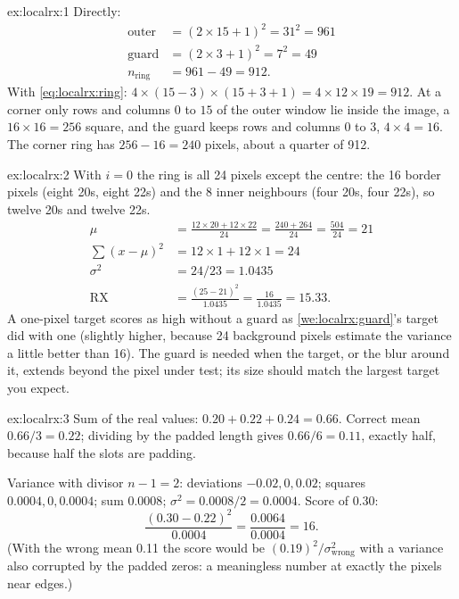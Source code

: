 
\begin{solution}{ex:localrx:1}
Directly:
\begin{align*}
\text{outer} &= (2\times15 + 1)^2 = 31^2 = 961\\
\text{guard} &= (2\times3 + 1)^2 = 7^2 = 49\\
n_{\text{ring}} &= 961 - 49 = 912 .
\end{align*}
With \cref{eq:localrx:ring}: $4\times(15 - 3)\times(15 + 3 + 1) = 4\times12\times19 = 912$.
At a corner only rows and columns $0$ to $15$ of the outer window lie inside the image, a
$16\times16 = 256$ square, and the guard keeps rows and columns $0$ to $3$, $4\times4 = 16$. The corner
ring has $256 - 16 = 240$ pixels, about a quarter of 912.
\end{solution}

\begin{solution}{ex:localrx:2}
With $i = 0$ the ring is all 24 pixels except the centre: the 16 border pixels (eight 20s, eight 22s)
and the 8 inner neighbours (four 20s, four 22s), so twelve 20s and twelve 22s.
\begin{align*}
\mu &= \frac{12\times20 + 12\times22}{24} = \frac{240 + 264}{24} = \frac{504}{24} = 21\\
\textstyle\sum(x - \mu)^2 &= 12\times1 + 12\times1 = 24\\
\sigma^2 &= 24/23 = 1.0435\\
\text{RX} &= \frac{(25 - 21)^2}{1.0435} = \frac{16}{1.0435} = 15.33 .
\end{align*}
A one-pixel target scores as high without a guard as \cref{we:localrx:guard}'s target did with one
(slightly higher, because 24 background pixels estimate the variance a little better than 16). The
guard is needed when the target, or the blur around it, extends beyond the pixel under test; its size
should match the largest target you expect.
\end{solution}

\begin{solution}{ex:localrx:3}
Sum of the real values: $0.20 + 0.22 + 0.24 = 0.66$. Correct mean $0.66/3 = 0.22$; dividing by the
padded length gives $0.66/6 = 0.11$, exactly half, because half the slots are padding.

Variance with divisor $n - 1 = 2$: deviations $-0.02, 0, 0.02$; squares $0.0004, 0, 0.0004$; sum
$0.0008$; $\sigma^2 = 0.0008/2 = 0.0004$. Score of $0.30$:
\[
\frac{(0.30 - 0.22)^2}{0.0004} = \frac{0.0064}{0.0004} = 16 .
\]
(With the wrong mean 0.11 the score would be $(0.19)^2/\sigma^2_{\text{wrong}}$ with a variance also
corrupted by the padded zeros: a meaningless number at exactly the pixels near edges.)
\end{solution}

